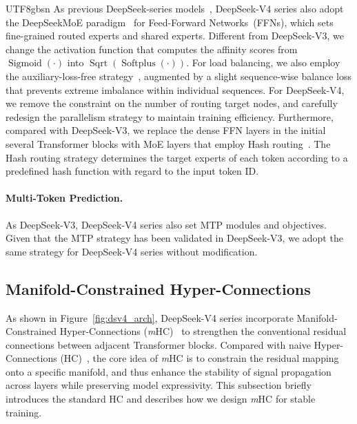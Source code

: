 \documentclass[11pt, a4paper, logo, copyright, nonumbering]{deepseek}
\newcommand{\dsmoe}{DeepSeekMoE}
\newcommand{\dsviii}{DeepSeek-V3}
\newcommand{\dsviv}{DeepSeek-V4}
\newcommand{\mhcfull}{Manifold-Constrained Hyper-Connections}
\newcommand{\mhc}{\textit{m}HC}
\begin{document}
\begin{CJK*}{UTF8}{gbsn}
As previous DeepSeek-series models~\citep{dsvii,dsv3}, \dsviv{} series also adopt the \dsmoe{} paradigm~\citep{deepseekmoe} for Feed-Forward Networks~(FFNs), which sets fine-grained routed experts and shared experts.
Different from \dsviii{}, we change the activation function that computes the affinity scores from $\operatorname{Sigmoid}(\cdot)$ into $\operatorname{Sqrt}(\operatorname{Softplus}(\cdot))$.
For load balancing, we also employ the auxiliary-loss-free strategy~\citep{noaux_tc,dsv3}, augmented by a slight sequence-wise balance loss that prevents extreme imbalance within individual sequences.
For \dsviv{}, we remove the constraint on the number of routing target nodes, and carefully redesign the parallelism strategy to maintain training efficiency.
Furthermore, compared with \dsviii{}, we replace the dense FFN layers in the initial several Transformer blocks with MoE layers that employ Hash routing~\citep{hash_layer}. 
The Hash routing strategy determines the target experts of each token according to a predefined hash function with regard to the input token ID.

\paragraph{Multi-Token Prediction.}

As \dsviii{}, \dsviv{} series also set MTP modules and objectives. 
Given that the MTP strategy has been validated in \dsviii{}, we adopt the same strategy for \dsviv{} series without modification.

\subsection{\mhcfull{}}

As shown in Figure~\ref{fig:dsv4_arch}, \dsviv{} series incorporate \mhcfull{} (\mhc{})~\citep{mhc} to strengthen the conventional residual connections between adjacent Transformer blocks. 
Compared with naive Hyper-Connections (HC)~\citep{hc}, the core idea of \mhc{} is to constrain the residual mapping onto a specific manifold, and thus enhance the stability of signal propagation across layers while preserving model expressivity.
This subsection briefly introduces the standard HC and describes how we design \mhc{} for stable training. 


\end{CJK*}
\end{document}
